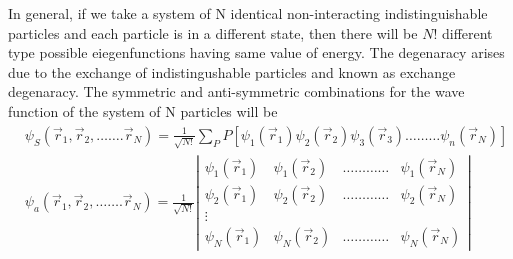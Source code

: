 In general, if we take a system of $\mathrm{N}$ identical non-interacting indistinguishable particles and each particle is in a different state, then there will be $N !$ different type possible eiegenfunctions having same value of energy. The degenaracy arises due to the exchange of indistingushable particles and known as exchange degenaracy. The symmetric and anti-symmetric combinations for the wave function of the system of $\mathrm{N}$ particles will be\\
$$\begin{aligned}
	&\psi_{S}\left(\vec{r}_{1}, \vec{r}_{2}, \ldots \ldots . \vec{r}_{N}\right)=\frac{1}{\sqrt{N !}} \sum_{P} \hat{P}\left[\psi_{1}\left(\vec{r}_{1}\right) \psi_{2}\left(\vec{r}_{2}\right) \psi_{3}\left(\vec{r}_{3}\right) \ldots \ldots \ldots \psi_{n}\left(\vec{r}_{N}\right)\right] \\
	&\psi_{a}\left(\vec{r}_{1}, \vec{r}_{2}, \ldots \ldots . \vec{r}_{N}\right)=\frac{1}{\sqrt{N !}}\left|\begin{array}{llll}
		\psi_{1}\left(\vec{r}_{1}\right) & \psi_{1}\left(\vec{r}_{2}\right) & \ldots \ldots \ldots \ldots & \psi_{1}\left(\vec{r}_{N}\right) \\
		\psi_{2}\left(\vec{r}_{1}\right) & \psi_{2}\left(\vec{r}_{2}\right) & \ldots \ldots \ldots \ldots & \psi_{2}\left(\vec{r}_{N}\right) \\
		\vdots & & & \\
		\psi_{N}\left(\vec{r}_{1}\right) & \psi_{N}\left(\vec{r}_{2}\right) & \ldots \ldots \ldots \ldots & \psi_{N}\left(\vec{r}_{N}\right)
	\end{array}\right|
\end{aligned}$$
